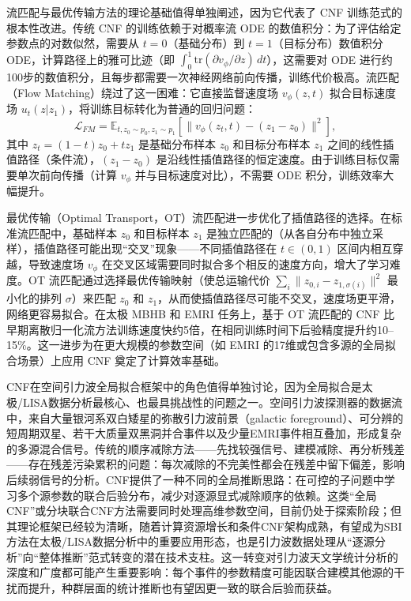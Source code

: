 流匹配与最优传输方法的理论基础值得单独阐述，因为它代表了 CNF 训练范式的根本性改进。传统 CNF 的训练依赖于对概率流 ODE 的数值积分：为了评估给定参数点的对数似然，需要从 $t=0$（基础分布）到 $t=1$（目标分布）数值积分 ODE，计算路径上的雅可比迹（即 $\int_0^1 \mathrm{tr}(\partial v_\phi/\partial z)\,dt$），这需要对 ODE 进行约100步的数值积分，且每步都需要一次神经网络前向传播，训练代价极高。流匹配（Flow Matching）绕过了这一困难：它直接监督速度场 $v_\phi(z, t)$ 拟合目标速度场 $u_t(z|z_1)$，将训练目标转化为普通的回归问题：
\begin{equation}
  \mathcal{L}_{FM} = \mathbb{E}_{t, z_0 \sim p_0, z_1 \sim p_1} \left[ \|v_\phi(z_t, t) - (z_1 - z_0)\|^2 \right],
\end{equation}
其中 $z_t = (1-t)z_0 + tz_1$ 是基础分布样本 $z_0$ 和目标分布样本 $z_1$ 之间的线性插值路径（条件流），$(z_1 - z_0)$ 是沿线性插值路径的恒定速度。由于训练目标仅需要单次前向传播（计算 $v_\phi$ 并与目标速度对比），不需要 ODE 积分，训练效率大幅提升。

最优传输（Optimal Transport，OT）流匹配进一步优化了插值路径的选择。在标准流匹配中，基础样本 $z_0$ 和目标样本 $z_1$ 是独立匹配的（从各自分布中独立采样），插值路径可能出现“交叉”现象——不同插值路径在 $t \in (0,1)$ 区间内相互穿越，导致速度场 $v_\phi$ 在交叉区域需要同时拟合多个相反的速度方向，增大了学习难度。OT 流匹配通过选择最优传输映射（使总运输代价 $\sum_i \|z_{0,i} - z_{1,\sigma(i)}\|^2$ 最小化的排列 $\sigma$）来匹配 $z_0$ 和 $z_1$，从而使插值路径尽可能不交叉，速度场更平滑，网络更容易拟合。在太极 MBHB 和 EMRI 任务上，基于 OT 流匹配的 CNF 比早期离散归一化流方法训练速度快约5倍，在相同训练时间下后验精度提升约10--15\%。这一进步为在更大规模的参数空间（如 EMRI 的17维或包含多源的全局拟合场景）上应用 CNF 奠定了计算效率基础。

CNF在空间引力波全局拟合框架中的角色值得单独讨论，因为全局拟合是太极/LISA数据分析最核心、也最具挑战性的问题之一。空间引力波探测器的数据流中，来自大量银河系双白矮星的弥散引力波前景（galactic foreground）、可分辨的短周期双星、若干大质量双黑洞并合事件以及少量EMRI事件相互叠加，形成复杂的多源混合信号。传统的顺序减除方法——先找较强信号、建模减除、再分析残差——存在残差污染累积的问题：每次减除的不完美性都会在残差中留下偏差，影响后续弱信号的分析。CNF提供了一种不同的全局推断思路：在可控的子问题中学习多个源参数的联合后验分布，减少对逐源显式减除顺序的依赖。这类“全局CNF”或分块联合CNF方法需要同时处理高维参数空间，目前仍处于探索阶段；但其理论框架已经较为清晰，随着计算资源增长和条件CNF架构成熟，有望成为SBI方法在太极/LISA数据分析中的重要应用形态，也是引力波数据处理从“逐源分析”向“整体推断”范式转变的潜在技术支柱。这一转变对引力波天文学统计分析的深度和广度都可能产生重要影响：每个事件的参数精度可能因联合建模其他源的干扰而提升，种群层面的统计推断也有望因更一致的联合后验而获益。

